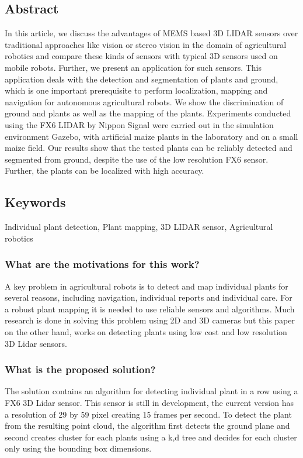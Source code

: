     \subsection*{Abstract}
    
    In this article, we discuss the advantages of MEMS based 3D LIDAR sensors over traditional approaches
    like vision or stereo vision in the domain of agricultural robotics and compare these kinds of sensors
    with typical 3D sensors used on mobile robots. Further, we present an application for such sensors. This
    application deals with the detection and segmentation of plants and ground, which is one important
    prerequisite to perform localization, mapping and navigation for autonomous agricultural robots. We
    show the discrimination of ground and plants as well as the mapping of the plants. Experiments conducted
    using the FX6 LIDAR by Nippon Signal were carried out in the simulation environment Gazebo, with
    artificial maize plants in the laboratory and on a small maize field. Our results show that the tested plants
    can be reliably detected and segmented from ground, despite the use of the low resolution FX6 sensor.
    Further, the plants can be localized with high accuracy.
    
    
    \subsection*{Keywords}
    Individual plant detection, Plant mapping, 3D LIDAR sensor, Agricultural robotics
    
    
     
    
    \subsubsection*{What are the motivations for this work?} 
    A key problem in agricultural robots is to detect and map individual plants for several reasons, including 
    navigation, individual reports and individual care. For a robust plant mapping it is needed to use reliable
    sensors and algorithms. Much research is done in solving this problem 
    using 2D and 3D cameras but this paper on the other hand, works on detecting plants using low cost and low resolution
    3D Lidar sensors. 
    \subsubsection*{What is the proposed solution?}
    The solution contains an algorithm for detecting individual plant in a row using a FX6 3D Lidar sensor. 
    This sensor is still in development, the current version has a resolution of 29 by 59 pixel creating 15 frames per second.
    To detect the plant from the resulting point cloud, the algorithm first detects the ground plane and second  
    creates cluster for each plants using a k,d tree and decides for each cluster only using the bounding box dimensions.
